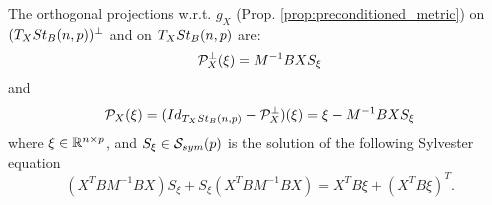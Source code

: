 \documentclass[11pt,a4paper]{article}
\begin{document}
\begin{prop}
The orthogonal projections w.r.t. $g_X$ (Prop. \ref{prop:preconditioned_metric}) on $(T_XSt_B(n,p))^\perp$ and on $T_XSt_B(n,p)$ are:
\begin{equation}\label{eqn:normal_projector}
\mathcal{P}^\perp_X(\xi) = M^{-1}BXS_{\xi}
\end{equation}
and 
\begin{equation}\label{eqn:tangent_projector}
\mathcal{P}_X(\xi) = (Id_{T_XSt_B(n,p)} - \mathcal{P}^\perp_X)(\xi) = \xi - M^{-1}BXS_\xi
\end{equation}
where $\xi\in \mathbb{R}^{n\times p}$, and $S_\xi\in \mathcal{S}_{sym}(p)$ is the solution of the following Sylvester equation
\begin{equation*}
(X^TBM^{-1}BX)S_\xi + S_\xi (X^TBM^{-1}BX) = X^TB\xi + (X^TB\xi)^T.
\end{equation*}
\end{prop}
\end{document}
